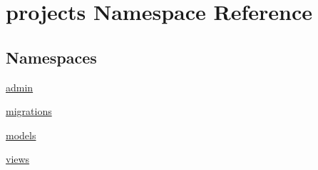 \hypertarget{namespaceprojects}{\section{projects Namespace Reference}
\label{namespaceprojects}
}
\subsection*{Namespaces}
\begin{DoxyCompactItemize}
\item 
\hyperlink{namespaceprojects_1_1admin}{admin}
\item 
\hyperlink{namespaceprojects_1_1migrations}{migrations}
\item 
\hyperlink{namespaceprojects_1_1models}{models}
\item 
\hyperlink{namespaceprojects_1_1views}{views}
\end{DoxyCompactItemize}
